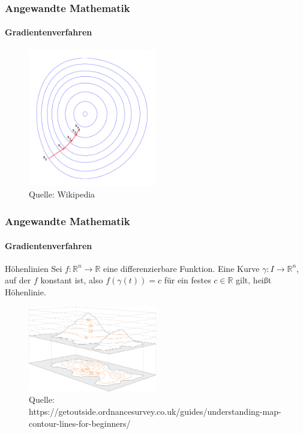 \documentclass{beamer}
\begin{document}
\begin{frame}
    \frametitle{Angewandte Mathematik}
\framesubtitle{Gradientenverfahren}
\begin{figure}[H]
      \centering
    \includegraphics[width=0.5\textwidth]{images/Gradient_descent}
      \caption{Quelle: Wikipedia}
\end{figure}

 \end{frame}




\begin{frame}
    \frametitle{Angewandte Mathematik}
\framesubtitle{Gradientenverfahren}
    \begin{block}{Höhenlinien}
Sei  $f: \mathbb{R}^n \to \mathbb{R}$  eine differenzierbare Funktion. Eine Kurve $\gamma : I \to \mathbb{R}^n$, auf der $f$ konstant ist, also 
$f(\gamma(t)) = c$ für ein festes $c \in \mathbb{R}$ gilt, heißt Höhenlinie.
\end{block}

\begin{figure}[H]
      \centering
    \includegraphics[width=0.5\textwidth]{images/Contours-and-relief}
      \caption{Quelle: https://getoutside.ordnancesurvey.co.uk/guides/understanding-map-contour-lines-for-beginners/}
\end{figure}

 \end{frame}
\end{document}
